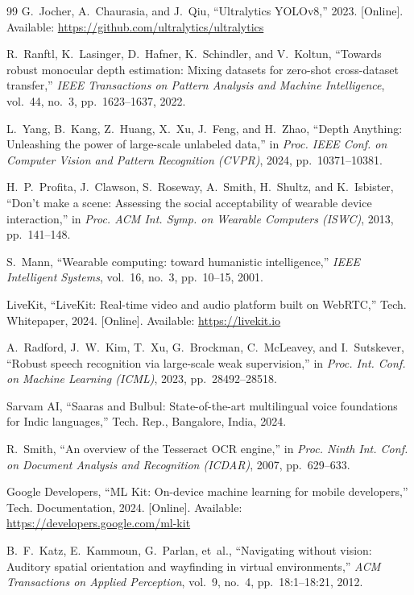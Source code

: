 \documentclass[10pt,twocolumn]{article}
\begin{document}
\begin{thebibliography}{99}
G.~Jocher, A.~Chaurasia, and J.~Qiu, ``Ultralytics YOLOv8,'' 2023. [Online]. Available: \url{https://github.com/ultralytics/ultralytics}

R.~Ranftl, K.~Lasinger, D.~Hafner, K.~Schindler, and V.~Koltun, ``Towards robust monocular depth estimation: Mixing datasets for zero-shot cross-dataset transfer,'' \emph{IEEE Transactions on Pattern Analysis and Machine Intelligence}, vol.~44, no.~3, pp.~1623--1637, 2022.

L.~Yang, B.~Kang, Z.~Huang, X.~Xu, J.~Feng, and H.~Zhao, ``Depth Anything: Unleashing the power of large-scale unlabeled data,'' in \emph{Proc. IEEE Conf. on Computer Vision and Pattern Recognition (CVPR)}, 2024, pp.~10371--10381.

H.~P.~Profita, J.~Clawson, S.~Roseway, A.~Smith, H.~Shultz, and K.~Isbister, ``Don't make a scene: Assessing the social acceptability of wearable device interaction,'' in \emph{Proc. ACM Int. Symp. on Wearable Computers (ISWC)}, 2013, pp.~141--148.

S.~Mann, ``Wearable computing: toward humanistic intelligence,'' \emph{IEEE Intelligent Systems}, vol.~16, no.~3, pp.~10--15, 2001.

LiveKit, ``LiveKit: Real-time video and audio platform built on WebRTC,'' Tech. Whitepaper, 2024. [Online]. Available: \url{https://livekit.io}

A.~Radford, J.~W.~Kim, T.~Xu, G.~Brockman, C.~McLeavey, and I.~Sutskever, ``Robust speech recognition via large-scale weak supervision,'' in \emph{Proc. Int. Conf. on Machine Learning (ICML)}, 2023, pp.~28492--28518.

Sarvam AI, ``Saaras and Bulbul: State-of-the-art multilingual voice foundations for Indic languages,'' Tech. Rep., Bangalore, India, 2024.

R.~Smith, ``An overview of the Tesseract OCR engine,'' in \emph{Proc. Ninth Int. Conf. on Document Analysis and Recognition (ICDAR)}, 2007, pp.~629--633.

Google Developers, ``ML Kit: On-device machine learning for mobile developers,'' Tech. Documentation, 2024. [Online]. Available: \url{https://developers.google.com/ml-kit}

B.~F.~Katz, E.~Kammoun, G.~Parlan, et~al., ``Navigating without vision: Auditory spatial orientation and wayfinding in virtual environments,'' \emph{ACM Transactions on Applied Perception}, vol.~9, no.~4, pp.~18:1--18:21, 2012.


\end{thebibliography}
\end{document}
